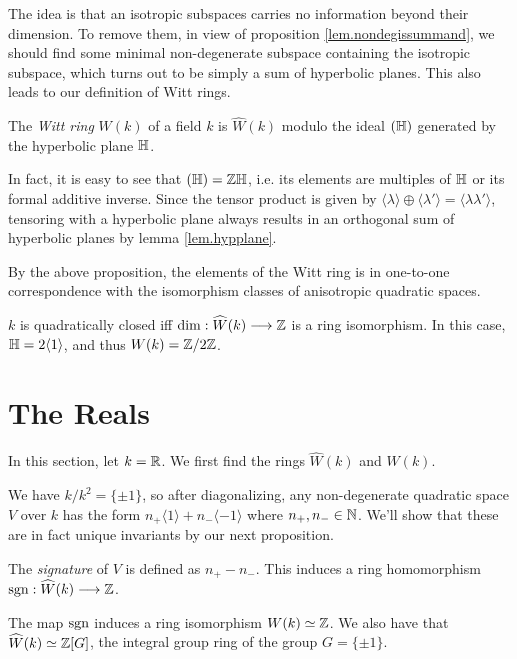 \documentclass{article}
\newcommand{\GW}{\widehat{W}}
\begin{document}
The idea is that an isotropic subspaces carries no information beyond their dimension. To remove them, in view of proposition \ref{lem.nondegissummand}, we should find some minimal non-degenerate subspace containing the isotropic subspace, which turns out to be simply a sum of hyperbolic planes. This also leads to our definition of Witt rings.

\begin{definition}
    The \emph{Witt ring} $W(k)$ of a field $k$ is $\GW(k)$ modulo the ideal $(\mathbb{H})$ generated by the hyperbolic plane $\mathbb{H}$.
\end{definition}

In fact, it is easy to see that $(\mathbb{H})=\mathbb{Z}\mathbb{H}$, i.e. its elements are multiples of $\mathbb{H}$ or its formal additive inverse. Since the tensor product is given by $\langle\lambda\rangle\oplus\langle\lambda'\rangle=\langle\lambda\lambda'\rangle$, tensoring with a hyperbolic plane always results in an orthogonal sum of hyperbolic planes by lemma \ref{lem.hypplane}. 

By the above proposition, the elements of the Witt ring is in one-to-one correspondence with the isomorphism classes of anisotropic quadratic spaces.

\begin{example}
    $k$ is quadratically closed iff $\dim:\GW(k)\longrightarrow\Z$ is a ring isomorphism. In this case, $\mathbb{H}=2\langle 1\rangle$, and thus $W(k)=\mathbb{Z}/2\mathbb{Z}$.
\end{example}

\section{The Reals}

In this section, let $k=\mathbb{R}$. We first find the rings $\GW(k)$ and $W(k)$.

We have $k/k^2=\{\pm 1\}$, so after diagonalizing, any non-degenerate quadratic space $V$ over $k$ has the form $n_+\langle1\rangle+n_-\langle-1\rangle$ where $n_+,n_-\in\mathbb{N}$. We'll show that these are in fact unique invariants by our next proposition.

\begin{definition}
    The \emph{signature} of $V$ is defined as $n_+-n_-$. This induces a ring homomorphism $\sgn:\GW(k)\longrightarrow\Z$.
\end{definition}

\begin{proposition}
    The map $\operatorname{sgn}$ induces a ring isomorphism $W(k)\simeq\mathbb{Z}$. We also have that $\GW(k)\simeq\Z[G]$, the integral group ring of the group $G=\{\pm 1\}$.
\end{proposition}
\end{document}
